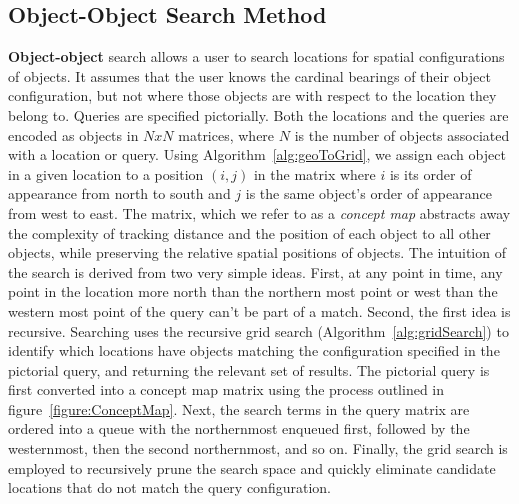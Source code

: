 \subsection{Object-Object Search Method}
\textbf{Object-object} search allows a user to search locations for spatial configurations of objects. 
It assumes that the user knows the cardinal bearings of their object configuration, but not where those objects are with respect to the location they belong to.
Queries are specified pictorially.
Both the locations and the queries are encoded as objects in $NxN$ matrices, where $N$ is the number of objects associated with a location or query. 
Using Algorithm~\ref{alg:geoToGrid}, we assign each object in a given location to a position $(i,j)$ in the matrix where $i$ is its order of appearance from north to south and $j$ is the same object's order of appearance from west to east.
The matrix, which we refer to as a \textit{concept map} abstracts away the complexity of tracking distance and the position of each object to all other objects, while preserving the relative spatial positions of objects. 
The intuition of the search is derived from two very simple ideas. First, at any point in time, any point in the location more north than the northern most point or west than the western most point of the query can't be part of a match.
Second, the first idea is recursive.
Searching uses the recursive grid search (Algorithm~\ref{alg:gridSearch}) to identify which locations have objects matching the configuration specified in the pictorial query, and returning the relevant set of results. 
The pictorial query is first converted into a concept map matrix using the process outlined in figure~\ref{figure:ConceptMap}.
Next, the search terms in the query matrix are ordered into a queue with the northernmost enqueued first, followed by the westernmost, then the second northernmost, and so on.
Finally, the grid search is employed to recursively prune the search space and quickly eliminate candidate locations that do not match the query configuration.

